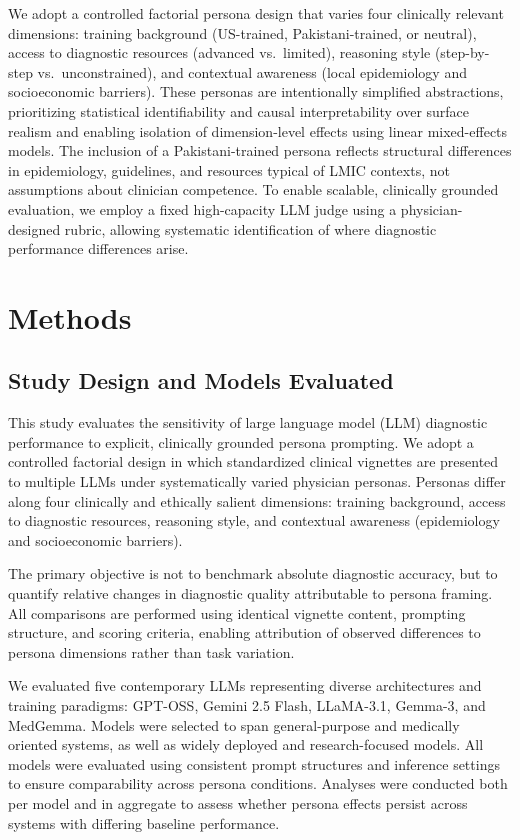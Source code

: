 \documentclass[sigconf]{acmart}
\begin{document}
We adopt a controlled factorial persona design that varies four clinically relevant dimensions: training background (US-trained, Pakistani-trained, or neutral), access to diagnostic resources (advanced vs.\ limited), reasoning style (step-by-step vs.\ unconstrained), and contextual awareness (local epidemiology and socioeconomic barriers). These personas are intentionally simplified abstractions, prioritizing statistical identifiability and causal interpretability over surface realism and enabling isolation of dimension-level effects using linear mixed-effects models. The inclusion of a Pakistani-trained persona reflects structural differences in epidemiology, guidelines, and resources typical of LMIC contexts, not assumptions about clinician competence. To enable scalable, clinically grounded evaluation, we employ a fixed high-capacity LLM judge using a physician-designed rubric, allowing systematic identification of where diagnostic performance differences arise.


\section{Methods}

\subsection{Study Design and Models Evaluated}

This study evaluates the sensitivity of large language model (LLM) diagnostic performance to explicit, clinically grounded persona prompting. We adopt a controlled factorial design in which standardized clinical vignettes are presented to multiple LLMs under systematically varied physician personas. Personas differ along four clinically and ethically salient dimensions: training background, access to diagnostic resources, reasoning style, and contextual awareness (epidemiology and socioeconomic barriers).

The primary objective is not to benchmark absolute diagnostic accuracy, but to quantify relative changes in diagnostic quality attributable to persona framing. All comparisons are performed using identical vignette content, prompting structure, and scoring criteria, enabling attribution of observed differences to persona dimensions rather than task variation.

We evaluated five contemporary LLMs representing diverse architectures and training paradigms: GPT-OSS, Gemini 2.5 Flash, LLaMA-3.1, Gemma-3, and MedGemma. Models were selected to span general-purpose and medically oriented systems, as well as widely deployed and research-focused models. All models were evaluated using consistent prompt structures and inference settings to ensure comparability across persona conditions. Analyses were conducted both per model and in aggregate to assess whether persona effects persist across systems with differing baseline performance.
\end{document}
